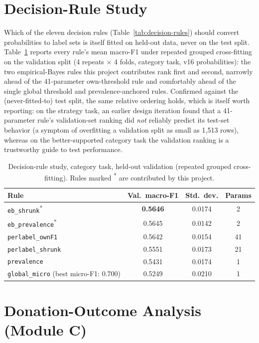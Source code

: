 \section{Decision-Rule Study}
\label{sec:decode-study}

Which of the eleven decision rules (Table~\ref{tab:decision-rules}) should
convert probabilities to label sets is itself fitted on held-out data, never
on the test split. Table~\ref{tab:decode-rules-val} reports every rule's
mean macro-F1 under repeated grouped cross-fitting on the validation split
(4 repeats $\times$ 4 folds, category task, v16 probabilities): the two
empirical-Bayes rules this project contributes rank first and second,
narrowly ahead of the 41-parameter own-threshold rule and comfortably ahead
of the single global threshold and prevalence-anchored rules. Confirmed
against the (never-fitted-to) test split, the same relative ordering holds,
which is itself worth reporting: on the strategy task, an earlier design
iteration found that a 41-parameter rule's validation-set ranking did
\emph{not} reliably predict its test-set behavior (a symptom of
overfitting a validation split as small as 1{,}513 rows), whereas on the
better-supported category task the validation ranking is a trustworthy guide
to test performance.

\begin{table}[H]
\centering
\caption{Decision-rule study, category task, held-out validation (repeated grouped cross-fitting).
Rules marked \textsuperscript{*} are contributed by this project.}
\label{tab:decode-rules-val}
\begin{tabular}{@{}lccc@{}}
\toprule
\textbf{Rule} & \textbf{Val.\ macro-F1} & \textbf{Std.\ dev.} & \textbf{Params} \\
\midrule
\texttt{eb\_shrunk}\textsuperscript{*} & \textbf{0.5646} & 0.0174 & 2 \\
\texttt{eb\_prevalence}\textsuperscript{*} & 0.5645 & 0.0142 & 2 \\
\texttt{perlabel\_ownF1} & 0.5642 & 0.0154 & 41 \\
\texttt{perlabel\_shrunk} & 0.5551 & 0.0173 & 21 \\
\texttt{prevalence} & 0.5431 & 0.0174 & 1 \\
\texttt{global\_micro} (best micro-F1: 0.700) & 0.5249 & 0.0210 & 1 \\
\bottomrule
\end{tabular}
\end{table}

\section{Donation-Outcome Analysis (Module C)}
\label{sec:phase4-results}

